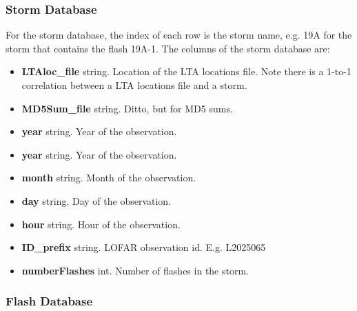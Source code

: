 \documentclass[]{article}
\begin{document}
\subsubsection{Storm Database}

For the storm database, the index of each row is the storm name, e.g. 19A for the storm that contains the flash 19A-1. The columns of the storm database are:
\begin{itemize}
	\item \textbf{LTAloc\_file} string. Location of the LTA locations file. Note there is a 1-to-1 correlation between a LTA locations file and a storm.
	\item \textbf{MD5Sum\_file} string. Ditto, but for MD5 sums. 
	\item \textbf{year} string. Year of the observation.
	\item \textbf{year} string. Year of the observation.
	\item \textbf{month} string. Month of the observation.
	\item \textbf{day} string. Day of the observation.
	\item \textbf{hour} string. Hour of the observation.
	\item \textbf{ID\_prefix} string. LOFAR observation id. E.g. L2025065
	\item \textbf{numberFlashes} int. Number of flashes in the storm.
\end{itemize}

\subsubsection{Flash Database}
\end{document}
